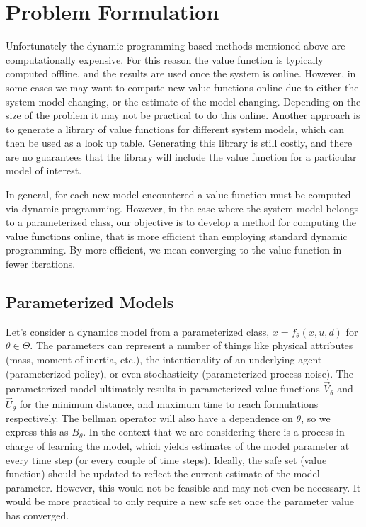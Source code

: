 \documentclass{journal}
\begin{document}
\section{Problem Formulation}
Unfortunately the dynamic programming based methods mentioned above are computationally expensive. For this reason the value function is typically computed offline, and the results are used once the system is online. However, in some cases we may want to compute new value functions online due to either the system model changing, or the estimate of the model changing. Depending on the size of the problem it may not be practical to do this online. Another approach is to generate a library of value functions for different system models, which can then be used as a look up table. Generating this library is still costly, and there are no guarantees that the library will include the value function for a particular model of interest. 

In general, for each new model encountered  a value function must be computed via dynamic programming. However, in the case where the system model belongs to a parameterized class, our objective is to develop a method for computing the value functions online, that is more efficient than employing standard dynamic programming. By more efficient, we mean converging to the value function in fewer iterations.

\subsection{Parameterized Models}

Let's consider a dynamics model from a  parameterized class, $\dot{x}=f_{\theta}(x,u,d)$ for $\theta \in \Theta$. The parameters can represent a number of things like physical attributes (mass, moment of inertia, etc.), the intentionality of an underlying agent (parameterized policy), or even stochasticity (parameterized process noise). The parameterized model ultimately results in parameterized value functions $\vec{V}_\theta$ and $\vec{U}_\theta$ for the minimum distance, and maximum time to reach formulations respectively. The bellman operator will also have a dependence on $\theta$, so we express this as $B_\theta$. In the context that we are considering there is a process in charge of learning the model, which yields estimates of the model parameter at every time step (or every couple of time steps). Ideally, the safe set (value function) should be updated to reflect the current estimate of the model parameter. However, this would not be feasible and may not even be necessary. It would be more practical to only require a new safe set once the parameter value has converged. 
\end{document}
